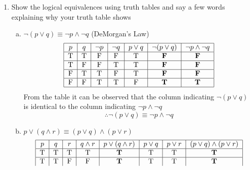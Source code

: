 \documentclass[12pt]{article}
\begin{document}
\begin{enumerate}

    \item Show the logical equivalences using truth tables and say a few words explaining why your truth table shows\\
        \begin{enumerate}[(a)]
            \item $\neg (p \vee q) \equiv  \neg p \wedge \neg q$ (DeMorgan's Law)\\
                \[ %
                    \begin{tabular}{|c|c|c|c|c|c|c|} 
                    \hline %
                    $p$ & $q$ & $\neg p$ & $\neg q$ & $p\vee q$ & $\neg (p \vee q) $ & $\neg p \wedge \neg q$  \\ %
                    \hline
                    T & T & F & F & T & \textbf{F} & \textbf{F}\\
                    \hline 
                    T & F & F & T & T & \textbf{F} & \textbf{F}\\
                    \hline
                    F & T & T & F & T & \textbf{F} & \textbf{F}\\
                    \hline
                    F & F & T & T & F & \textbf{T} & \textbf{T}\\
                    \hline
                    \end{tabular} %
                \] %
                From the table it can be observed that the column indicating $\neg (p \vee q)$ is identical to the column indicating $\neg p \wedge \neg q $
                \[
                \therefore \neg (p \vee q) \equiv  \neg p \wedge \neg q
                \]
            \item $p\vee (q \wedge r) \equiv (p\vee q)\wedge(p \vee r)$
                \[
                    \begin{tabular}{|c|c|c|c|c|c|c|c|}
                    \hline
                    $p$ & $q$ & $r$ & $q \wedge r$ & $p \vee (q \wedge r)$ & $p \vee q$ & $p \vee r$ & $(p \vee q) \wedge (p \vee r)$\\
                    \hline
                    T&T&T&T&\textbf{T}&T&T&\textbf{T}\\
                    \hline
                    T&T&F&F&\textbf{T}&T&T&\textbf{T}\\

\end{tabular}\]
\end{enumerate}
\end{enumerate}
\end{document}
